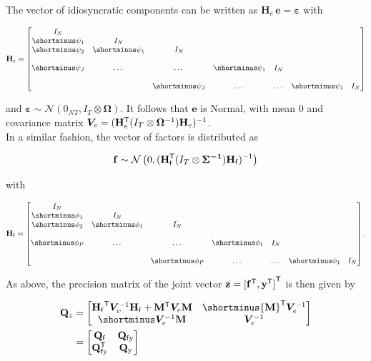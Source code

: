 \documentclass[notitlepage,a4paper,12pt]{article}
\newcommand{\transpose}[1]{{#1}^{\sf{T}}}
\begin{document}
The vector of idiosyncratic components can be written as $\mathbf{H}_e\, \mathbf{e} = \boldsymbol{\varepsilon}$ with 

$$
\mathbf{H}_e
=
\begin{bmatrix}
    I_N &  \\
    \shortminus \psi_1 & I_N &  \\
    \shortminus \psi_2 & \shortminus \psi_1 & I_N &  \\
     &  &  &  &  & \\
    \shortminus \psi_J & \dots & \dots & \shortminus \psi_1 & I_N \\
     &  &  &  &  & \\
    & & \shortminus \psi_J & \dots & \dots & \shortminus \psi_1 & I_N
\end{bmatrix}
$$

\noindent and $\boldsymbol{\varepsilon} \sim \mathcal{N}(0_{NT}, I_T \otimes \boldsymbol{\Omega})$. It follows that $\mathbf{e}$ is Normal, with mean $0$ and covariance matrix $\bm{V}_{e} = (\transpose{\mathbf{H}}_{e} (I_T \otimes \boldsymbol{\Omega}^{-1}) \mathbf{H}_e)^{-1}$. \\

In a similar fashion, the vector of factors is distributed as 

$$
\mathbf{f} \sim \mathcal{N}\left(0, (\transpose{\mathbf{H}}_{\sf{f}} (I_T \otimes \boldsymbol{\Sigma^{-1}}) \mathbf{H}_{\sf{f}})^{-1}\right)
$$

with 

$$
\mathbf{H}_{\sf{f}}
=
\begin{bmatrix}
    I_N &  \\
    \shortminus \phi_1 & I_N &  \\
    \shortminus \phi_2 & \shortminus \phi_1 & I_N &  \\
     &  &  &  &  & \\
    \shortminus \phi_P & \dots & \dots & \shortminus \phi_1 & I_N \\
     &  &  &  &  & \\
    & & \shortminus \phi_P & \dots & \dots & \shortminus \phi_1 & I_N
\end{bmatrix}.
$$

As above, the precision matrix of the joint vector $\mathbf{z} = \transpose{[\transpose{\mathbf{f}}, \transpose{\mathbf{y}}]}$ is then given by 

\begin{align*}
    \mathbf{Q}_z 
    &= 
    \begin{bmatrix}
         \transpose{\mathbf{H}_{\sf{f}}} \bm{V}^{-1}_{\upsilon} \mathbf{H}_{\sf{f}} + \transpose{\mathbf{M}}\bm{V}_{e}\mathbf{M}  & \shortminus \transpose{\mathbf{M}} \bm{V}^{-1}_{e} \\
         \shortminus \bm{V}^{-1}_{e} \mathbf{M} & \bm{V}^{-1}_{e}
    \end{bmatrix} \\
    &= 
    \begin{bmatrix}
        \mathbf{Q}_{\sf{f}} & \mathbf{Q}_{\sf{f}\text{y}} \\
        \transpose{\mathbf{Q}}_{\sf{f} \text{y}} & \mathbf{Q}_{\text{y}}  
    \end{bmatrix}
\end{align*}
\end{document}
